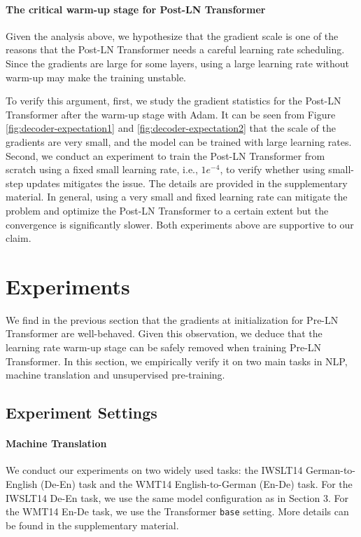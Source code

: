 \documentclass{article}
\begin{document}
\paragraph{The critical warm-up stage for Post-LN Transformer
} Given the analysis above, we hypothesize that the gradient scale is one of the reasons that the Post-LN Transformer needs a careful learning rate scheduling. Since the gradients are large for some layers, using a large learning rate without warm-up may make the training unstable. 

To verify this argument, first, we study the gradient statistics for the Post-LN Transformer after the warm-up stage with Adam. It can be seen from Figure \ref{fig:decoder-expectation1} and \ref{fig:decoder-expectation2} that the scale of the gradients are very small, and the model can be trained with large learning rates. Second, we conduct an experiment to train the Post-LN Transformer from scratch using a fixed small learning rate, i.e., $1e^{-4}$,  to verify whether using small-step updates mitigates the issue. The details are provided in the supplementary material. In general, using a very small and fixed learning rate can mitigate the problem and optimize the Post-LN Transformer to a certain extent but the convergence is significantly slower. Both experiments above are supportive to our claim.


\section{Experiments}
We find in the previous section that the gradients at initialization for Pre-LN Transformer are well-behaved. Given this observation, we deduce that the learning rate warm-up stage can be safely removed when training Pre-LN Transformer. In this section, we empirically verify it on two main tasks in NLP, machine translation and unsupervised pre-training.

\subsection{Experiment Settings}
\paragraph{Machine Translation}
We conduct our experiments on two widely used tasks: the IWSLT14 German-to-English (De-En) task and the WMT14 English-to-German (En-De) task. 
For the IWSLT14 De-En task, we use the same model configuration as in Section 3. For the WMT14 En-De task, we use the Transformer \texttt{base} setting. More details can be found in the supplementary material.  
\end{document}
